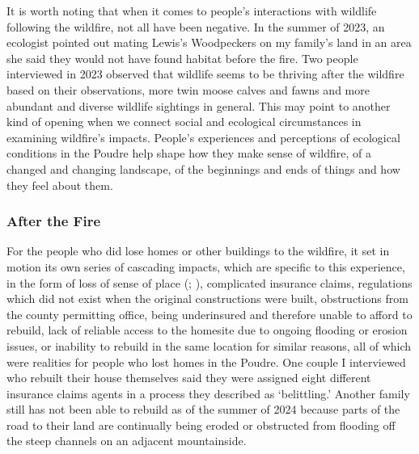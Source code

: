 \documentclass[
]{article}
\begin{document}
It is worth noting that when it comes to people's interactions with wildlife following the wildfire, not all have been negative. In the summer of 2023, an ecologist pointed out mating Lewis's Woodpeckers on my family's land in an area she said they would not have found habitat before the fire. Two people interviewed in 2023 observed that wildlife seems to be thriving after the wildfire based on their observations, more twin moose calves and fawns and more abundant and diverse wildlife sightings in general. This may point to another kind of opening when we connect social and ecological circumstances in examining wildfire's impacts. People's experiences and perceptions of ecological conditions in the Poudre help shape how they make sense of wildfire, of a changed and changing landscape, of the beginnings and ends of things and how they feel about them.

\subsubsection{After the Fire}\label{after-the-fire}

For the people who did lose homes or other buildings to the wildfire, it set in motion its own series of cascading impacts, which are specific to this experience, in the form of loss of sense of place (; ), complicated insurance claims, regulations which did not exist when the original constructions were built, obstructions from the county permitting office, being underinsured and therefore unable to afford to rebuild, lack of reliable access to the homesite due to ongoing flooding or erosion issues, or inability to rebuild in the same location for similar reasons, all of which were realities for people who lost homes in the Poudre. One couple I interviewed who rebuilt their house themselves said they were assigned eight different insurance claims agents in a process they described as `belittling.' Another family still has not been able to rebuild as of the summer of 2024 because parts of the road to their land are continually being eroded or obstructed from flooding off the steep channels on an adjacent mountainside.
\end{document}
